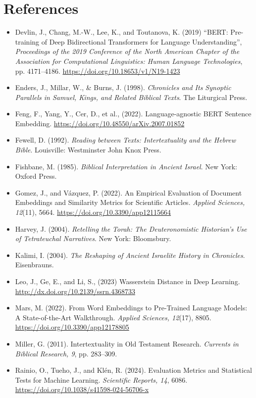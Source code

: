 \documentclass[12pt]{article}
\begin{document}
\section*{References}
\begin{itemize}
    \item Devlin, J., Chang, M.-W., Lee, K., and Toutanova, K. (2019) “BERT: Pre-training of Deep Bidirectional Transformers for Language Understanding”, \textit{Proceedings of the 2019 Conference of the North American Chapter of the Association for Computational Linguistics: Human Language Technologies}, pp. 4171–4186. \url{https://doi.org/10.18653/v1/N19-1423}
    \item Enders, J., Millar, W., \& Burns, J. (1998). \textit{Chronicles and Its Synoptic Parallels in Samuel, Kings, and Related Biblical Texts}. The Liturgical Press.
    \item Feng, F., Yang, Y., Cer, D., et al., (2022). Language-agnostic BERT Sentence Embedding. \url{https://doi.org/10.48550/arXiv.2007.01852}
    \item Fewell, D. (1992). \textit{Reading between Texts: Intertextuality and the Hebrew Bible}. Louisville: Westminster John Knox Press.
    \item Fishbane, M. (1985). \textit{Biblical Interpretation in Ancient Israel}. New York: Oxford Press.
    \item Gomez, J., and Vázquez, P. (2022). An Empirical Evaluation of Document Embeddings and Similarity Metrics for Scientific Articles. \textit{Applied Sciences, 12}(11), 5664. \url{https://doi.org/10.3390/app12115664}
    \item Harvey, J. (2004). \textit{Retelling the Torah: The Deuteronomistic Historian’s Use of Tetrateuchal Narratives}. New York: Bloomsbury.
    \item Kalimi, I. (2004). \textit{The Reshaping of Ancient Israelite History in Chronicles}. Eisenbrauns.
    \item Leo, J., Ge, E., and Li, S., (2023) Wasserstein Distance in Deep Learning. \url{http://dx.doi.org/10.2139/ssrn.4368733} 
    \item Mars, M. (2022). From Word Embeddings to Pre-Trained Language Models: A State-of-the-Art Walkthrough. \textit{Applied Sciences, 12}(17), 8805. \url{https://doi.org/10.3390/app12178805}
    \item Miller, G. (2011). Intertextuality in Old Testament Research. \textit{Currents in Biblical Research, 9}, pp. 283–309.
    \item Rainio, O., Tueho, J., and Klén, R. (2024). Evaluation Metrics and Statistical Tests for Machine Learning. \textit{Scientific Reports, 14}, 6086. \url{https://doi.org/10.1038/s41598-024-56706-x}

\end{itemize}
\end{document}
